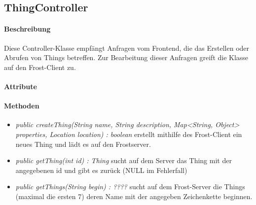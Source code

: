 \subsection{ThingController}

\paragraph{Beschreibung}
Diese Controller-Klasse empfängt Anfragen vom Frontend, die das Erstellen oder Abrufen von Things betreffen. Zur Bearbeitung dieser Anfragen greift die Klasse auf den Frost-Client zu.


\paragraph{Attribute}

\paragraph{Methoden}
\begin{itemize}
\item \textit{public createThing(String name, String description, Map<String, Object> properties, Location location) : boolean }
erstellt mithilfe des Frost-Client ein neues Thing und lädt es auf den Frostserver.
\item \textit{public getThing(int id) : Thing}
sucht auf dem Server das Thing mit der angegebenen id und gibt es zurück (NULL im Fehlerfall)
\item \textit{public getThings(String begin) : ???? }
sucht auf dem Frost-Server die Things (maximal die ersten 7) deren Name mit der angegeben Zeichenkette beginnen.
\end{itemize}